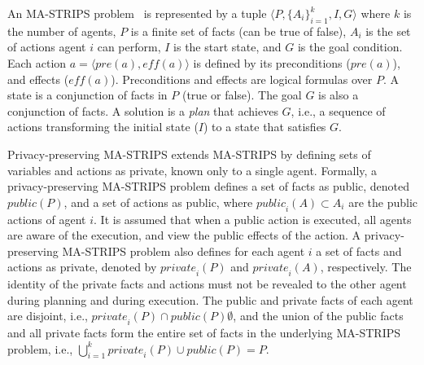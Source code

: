 \documentclass[letterpaper]{article}
\newcommand{\private}{\textit{private}}
\newcommand{\eff}{\textit{eff}}
\newcommand{\pre}{\textit{pre}}
\newcommand{\public}{\textit{public}}
\newcommand\roni[1]{\textcolor{blue}{roni: #1}}
\theoremstyle{definition}
\begin{document}
An MA-STRIPS problem~\citep{brafman2013complexity} is represented by a tuple $\langle P, \{A_i\}_{i=1}^k, I ,G \rangle$ where $k$ is the number of agents, $P$ is a finite set of facts (can be true of false), $A_i$ is the set of actions agent $i$ can perform, $I$ is the start state, and $G$ is the goal condition.
Each action $a=\langle \pre(a), \eff(a) \rangle$ is defined by its preconditions ($\pre(a)$), and effects ($\eff(a)$). Preconditions and effects are logical formulas over $P$. A state is a conjunction of facts in $P$ (true or false). The goal $G$ is also a conjunction of facts.
A solution is a {\em plan} that achieves $G$, i.e., a sequence of actions transforming the initial state ($I$) to a state that satisfies $G$. %


Privacy-preserving MA-STRIPS extends MA-STRIPS by defining sets of variables and actions as private, known only to a single agent. Formally,
a privacy-preserving MA-STRIPS problem defines a set of facts as public, denoted $\public(P)$, and a set of actions as public, where $\public_i(A) \subset A_i$ are the public actions of agent $i$.
It is assumed that when a public action is executed, all agents are aware of the execution, and view the public effects of the action.
A privacy-preserving MA-STRIPS problem also defines for each agent $i$ a set of facts and actions as private, denoted by $\private_i(P)$ and $\private_i(A)$, respectively. The identity of the private facts and actions must not be revealed to the other agent during planning and during execution. The public and private facts of each agent are disjoint, i.e., $\private_i(P)\cap \public(P)\emptyset$, and the union of the public facts and all private facts form the entire set of facts in the underlying MA-STRIPS problem, i.e., $\bigcup_{i=1}^k \private_i(P) \cup \public(P)=P$.
\end{document}
